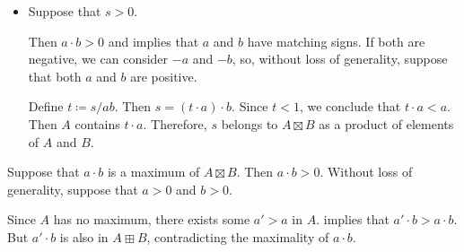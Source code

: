 \begin{defproof}
\begin{itemize}
    \item Suppose that \( s > 0 \).

    Then \( a \cdot b > 0 \) and  implies that \( a \) and \( b \) have matching signs. If both are negative, we can consider \( -a \) and \( -b \), so, without loss of generality, suppose that both \( a \) and \( b \) are positive.

    Define \( t \coloneqq s / ab \). Then \( s = (t \cdot a) \cdot b \). Since \( t < 1 \), we conclude that \( t \cdot a < a \). Then \( A \) contains \( t \cdot a \). Therefore, \( s \) belongs to \( A \boxtimes B \) as a product of elements of \( A \) and \( B \).
  \end{itemize}

   Suppose that \( a \cdot b \) is a maximum of \( A \boxtimes B \). Then \( a \cdot b > 0 \). Without loss of generality, suppose that \( a > 0 \) and \( b > 0 \).

  Since \( A \) has no maximum, there exists some \( a' > a \) in \( A \).  implies that \( a' \cdot b > a \cdot b \). But \( a' \cdot b \) is also in \( A \boxplus B \), contradicting the maximality of \( a \cdot b \).
\end{defproof}

